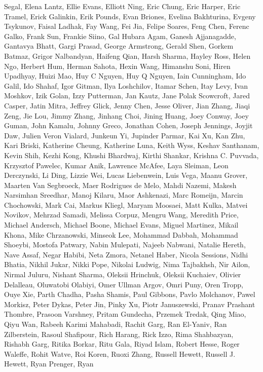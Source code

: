 \documentclass[
  10
]{article}
\begin{document}
Segal, Elena Lantz, Ellie Evans, Elliott Ning, Eric Chung, Eric Harper,
Eric Tramel, Erick Galinkin, Erik Pounds, Evan Briones, Evelina
Bakhturina, Evgeny Tsykunov, Faisal Ladhak, Fay Wang, Fei Jia, Felipe
Soares, Feng Chen, Ferenc Galko, Frank Sun, Frankie Siino, Gal Hubara
Agam, Ganesh Ajjanagadde, Gantavya Bhatt, Gargi Prasad, George
Armstrong, Gerald Shen, Gorkem Batmaz, Grigor Nalbandyan, Haifeng Qian,
Harsh Sharma, Hayley Ross, Helen Ngo, Herbert Hum, Herman Sahota, Hexin
Wang, Himanshu Soni, Hiren Upadhyay, Huizi Mao, Huy C Nguyen, Huy Q
Nguyen, Iain Cunningham, Ido Galil, Ido Shahaf, Igor Gitman, Ilya
Loshchilov, Itamar Schen, Itay Levy, Ivan Moshkov, Izik Golan, Izzy
Putterman, Jan Kautz, Jane Polak Scowcroft, Jared Casper, Jatin Mitra,
Jeffrey Glick, Jenny Chen, Jesse Oliver, Jian Zhang, Jiaqi Zeng, Jie Lou,
Jimmy Zhang, Jinhang Choi, Jining Huang, Joey Conway, Joey Guman, John
Kamalu, Johnny Greco, Jonathan Cohen, Joseph Jennings, Joyjit Daw,
Julien Veron Vialard, Junkeun Yi, Jupinder Parmar, Kai Xu, Kan Zhu, Kari
Briski, Katherine Cheung, Katherine Luna, Keith Wyss, Keshav Santhanam,
Kevin Shih, Kezhi Kong, Khushi Bhardwaj, Kirthi Shankar, Krishna C.
Puvvada, Krzysztof Pawelec, Kumar Anik, Lawrence McAfee, Laya Sleiman,
Leon Derczynski, Li Ding, Lizzie Wei, Lucas Liebenwein, Luis Vega, Maanu
Grover, Maarten Van Segbroeck, Maer Rodrigues de Melo, Mahdi Nazemi,
Makesh Narsimhan Sreedhar, Manoj Kilaru, Maor Ashkenazi, Marc Romeijn,
Marcin Chochowski, Mark Cai, Markus Kliegl, Maryam Moosaei, Matt Kulka,
Matvei Novikov, Mehrzad Samadi, Melissa Corpuz, Mengru Wang, Meredith
Price, Michael Andersch, Michael Boone, Michael Evans, Miguel Martinez,
Mikail Khona, Mike Chrzanowski, Minseok Lee, Mohammad Dabbah, Mohammad
Shoeybi, Mostofa Patwary, Nabin Mulepati, Najeeb Nabwani, Natalie
Hereth, Nave Assaf, Negar Habibi, Neta Zmora, Netanel Haber, Nicola
Sessions, Nidhi Bhatia, Nikhil Jukar, Nikki Pope, Nikolai Ludwig, Nima
Tajbakhsh, Nir Ailon, Nirmal Juluru, Nishant Sharma, Oleksii Hrinchuk,
Oleksii Kuchaiev, Olivier Delalleau, Oluwatobi Olabiyi, Omer Ullman
Argov, Omri Puny, Oren Tropp, Ouye Xie, Parth Chadha, Pasha Shamis, Paul
Gibbons, Pavlo Molchanov, Pawel Morkisz, Peter Dykas, Peter Jin, Pinky
Xu, Piotr Januszewski, Pranav Prashant Thombre, Prasoon Varshney, Pritam
Gundecha, Przemek Tredak, Qing Miao, Qiyu Wan, Rabeeh Karimi Mahabadi,
Rachit Garg, Ran El-Yaniv, Ran Zilberstein, Rasoul Shafipour, Rich
Harang, Rick Izzo, Rima Shahbazyan, Rishabh Garg, Ritika Borkar, Ritu
Gala, Riyad Islam, Robert Hesse, Roger Waleffe, Rohit Watve, Roi Koren,
Ruoxi Zhang, Russell Hewett, Russell J. Hewett, Ryan Prenger, Ryan
\end{document}
